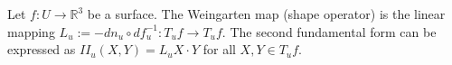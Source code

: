 Let $f: U \to \mathbb{R}^3$ be a surface. The Weingarten map (shape operator) is the linear mapping $L_u := -dn_u \circ df_u^{-1}: T_u f \to T_u f$. The second fundamental form can be expressed as $II_u(X, Y) = L_u X \cdot Y$ for all $X, Y \in T_u f$.